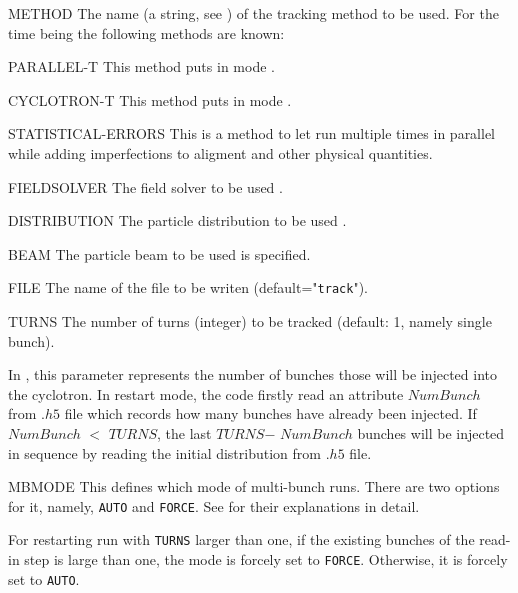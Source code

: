 \begin{kdescription}
\item[METHOD]
  The name (a string, see ) of the tracking method to be used.
  For the time being the following methods are known:
  \begin{kdescription}
    \item[PARALLEL-T]
    This method puts \opal in \opalt mode .
    \item[CYCLOTRON-T]
    This method puts \opal in \opalcycl mode .
    \item[STATISTICAL-ERRORS]
    This is a method to let \opal run multiple times in parallel while adding imperfections to aligment and other physical quantities.
  \end{kdescription}
  \item[FIELDSOLVER]
  The field solver to be used .

  \item[DISTRIBUTION]
  The particle distribution to be used .

  \item[BEAM]
  The particle beam  to be used is specified.

  \item[FILE]
  The name of the file to be writen (default="\texttt{track}").
  \item[TURNS]
  The number of turns (integer) to be tracked (default: 1, namely single bunch).

  In \opalcycl, this parameter represents the number of bunches those will be injected into the cyclotron. In restart mode, the code
  firstly read an attribute $NumBunch$ from $.h5$ file which records how many bunches have already been injected. If $NumBunch$
  $<$ $TURNS$, the last $TURNS$$ -$ $NumBunch$ bunches will be injected in sequence by reading the initial distribution from $.h5$ file.

  \item[MBMODE]
  This defines which mode of multi-bunch runs. There are two options for it, namely, \texttt{AUTO} and \texttt{FORCE}.
  See  for their explanations in detail.

  For restarting run with \texttt{TURNS} larger than one, if the existing bunches of the read-in step is large than one,
  the mode is forcely set to \texttt{FORCE}. Otherwise, it is forcely set to \texttt{AUTO}.


\end{kdescription}
